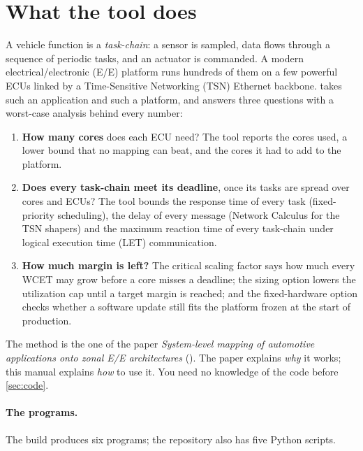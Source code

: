 \section{What the tool does}
\label{sec:what}

A vehicle function is a \emph{task-chain}: a sensor is sampled, data flows
through a sequence of periodic tasks, and an actuator is commanded. A
modern electrical/electronic (E/E) platform runs hundreds of them on a few
powerful ECUs linked by a Time-Sensitive Networking (TSN) Ethernet
backbone.  takes such an application and such a platform,
and answers three questions with a worst-case analysis behind every
number:
\begin{enumerate}
\item \textbf{How many cores} does each ECU need? The tool reports the
cores used, a lower bound that no mapping can beat, and the cores it had
to add to the platform.
\item \textbf{Does every task-chain meet its deadline}, once its tasks are
spread over cores and ECUs? The tool bounds the response time of every
task (fixed-priority scheduling), the delay of every message (Network
Calculus for the TSN shapers) and the maximum reaction time of every
task-chain under logical execution time (LET) communication.
\item \textbf{How much margin is left?} The critical scaling factor says
how much every WCET may grow before a core misses a deadline; the sizing
option lowers the utilization cap until a target margin is reached; and
the fixed-hardware option checks whether a software update still fits the
platform frozen at the start of production.
\end{enumerate}
The method is the one of the paper \emph{System-level mapping of automotive applications onto zonal E/E architectures} ().
The paper explains \emph{why} it works; this manual explains \emph{how} to
use it. You need no knowledge of the code before \cref{sec:code}.

\paragraph{The programs.} The build produces six programs; the repository
also has five Python scripts.


